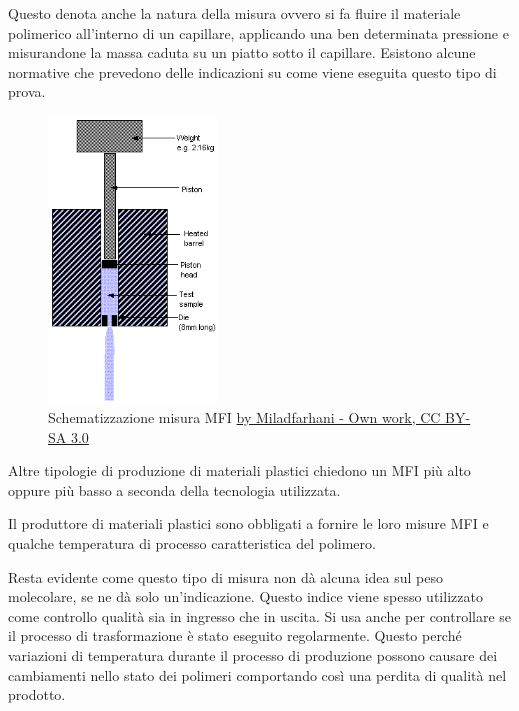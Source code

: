 Questo denota anche la natura della misura ovvero si fa fluire il materiale polimerico all'interno di un capillare, applicando una ben determinata pressione e misurandone la massa caduta su un piatto sotto il capillare. Esistono alcune normative che prevedono delle indicazioni su come viene eseguita questo tipo di prova.

\begin{figure}
\centering
\includegraphics[width = 0.4\textwidth]{gfx/MFI}
\caption{Schematizzazione misura \ac{MFI} \href{https://commons.wikimedia.org/w/index.php?curid=33527584}{by Miladfarhani - Own work, CC BY-SA 3.0}}
\label{fig:MFI}
\end{figure}

Altre tipologie di produzione di materiali plastici chiedono un \ac{MFI} più alto oppure più basso a seconda della tecnologia utilizzata.

Il produttore di materiali plastici sono obbligati a fornire le loro misure \ac{MFI} e qualche temperatura di processo caratteristica del polimero.

Resta evidente come questo tipo di misura non dà alcuna idea sul peso molecolare, se ne dà solo un'indicazione.
Questo indice viene spesso utilizzato come controllo qualità sia in ingresso che in uscita. Si usa anche per controllare se il processo di trasformazione è stato eseguito regolarmente.
Questo perché variazioni di temperatura durante il processo di produzione possono causare dei cambiamenti nello stato dei polimeri comportando così una perdita di qualità nel prodotto. 

